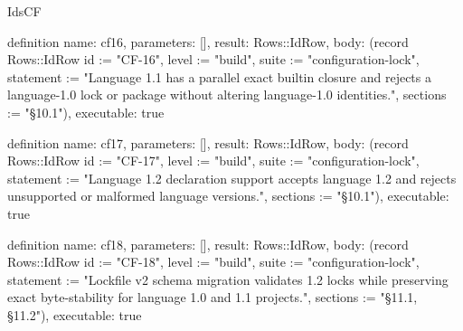 \begin{lexlean}{IdsCF}
\begin{semanticmodule}
definition{
  name: cf16,
  parameters: [],
  result: Rows::IdRow,
  body: (record Rows::IdRow {id := "CF-16", level := "build", suite := "configuration-lock", statement := "Language 1.1 has a parallel exact builtin closure and rejects a language-1.0 lock or package without altering language-1.0 identities.", sections := "§10.1"}),
  executable: true
}

definition{
  name: cf17,
  parameters: [],
  result: Rows::IdRow,
  body: (record Rows::IdRow {id := "CF-17", level := "build", suite := "configuration-lock", statement := "Language 1.2 declaration support accepts language 1.2 and rejects unsupported or malformed language versions.", sections := "§10.1"}),
  executable: true
}

definition{
  name: cf18,
  parameters: [],
  result: Rows::IdRow,
  body: (record Rows::IdRow {id := "CF-18", level := "build", suite := "configuration-lock", statement := "Lockfile v2 schema migration validates 1.2 locks while preserving exact byte-stability for language 1.0 and 1.1 projects.", sections := "§11.1, §11.2"}),
  executable: true
}
\end{semanticmodule}
\end{lexlean}
